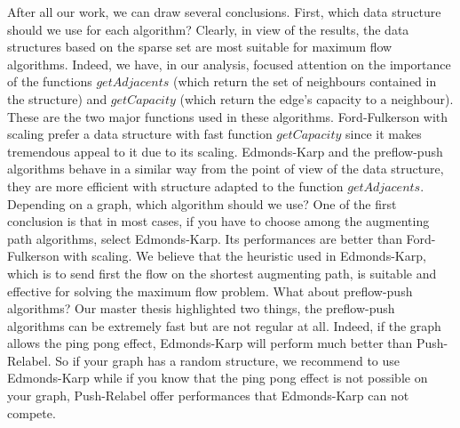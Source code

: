 
After all our work, we can draw several conclusions. First, which data structure should we use for each algorithm? Clearly, in view of the results, the data structures based on the sparse set are most suitable for maximum flow algorithms. Indeed, we have, in our analysis, focused attention on the importance of the functions $getAdjacents$ (which return the set of neighbours contained in the structure) and $getCapacity$ (which return the edge's capacity to a neighbour). These are the two major functions used in these algorithms. Ford-Fulkerson with scaling prefer a data structure with fast function $getCapacity$ since it makes tremendous appeal to it due to its scaling. Edmonds-Karp and the preflow-push algorithms behave in a similar way from the point of view of the data structure, they are more efficient with structure adapted to the function $getAdjacents$.
\\

Depending on a graph, which algorithm should we use? One of the first conclusion is that in most cases, if you have to choose among the augmenting path algorithms, select Edmonds-Karp. Its performances are better than Ford-Fulkerson with scaling. We believe that the heuristic used in Edmonds-Karp, which is to send first the flow on the shortest augmenting path, is suitable and effective for solving the maximum flow problem. What about preflow-push algorithms? Our master thesis highlighted two things, the preflow-push algorithms can be extremely fast but are not regular at all. Indeed, if the graph allows the ping pong effect, Edmonds-Karp will perform much better than Push-Relabel. So if your graph has a random structure, we recommend to use Edmonds-Karp while if you know that the ping pong effect is not possible on your graph, Push-Relabel offer performances that Edmonds-Karp can not compete.